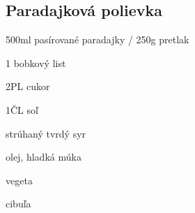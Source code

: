 \setcounter{step}{0}
\subsection{Paradajková polievka}

\begin{ingredient}
\begin{main}
	\item 500ml pasírované paradajky / 250g pretlak
	\item 1 bobkový list
	\item 2PL cukor
	\item 1ČL soľ
	\item strúhaný tvrdý syr
	\item olej, hladká múka
	\item vegeta
	\item cibuľa
\end{main}
\end{ingredient}%
\begin{recipe}


\end{recipe}

\begin{notes}

\end{notes}	